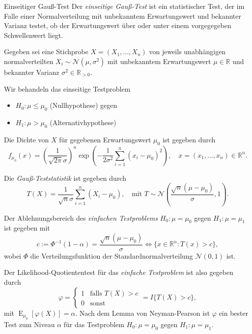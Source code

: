 \begin{defi}{Einseitiger Gauß-Test}
    Der \emph{einseitige Gauß-Test} ist ein statistischer Test, der im Falle einer Normalverteilung mit unbekanntem Erwartungswert und bekannter Varianz testet, ob der Erwartungswert über oder unter einem vorgegegeben Schwellenwert liegt.

    Gegeben sei eine Stichprobe $X = (X_1, \ldots, X_n)$ von jeweils unabhängigen normalverteilten $X_i \sim \mathcal{N}(\mu, \sigma^2)$ mit unbekanntem Erwartungswert $\mu \in \mathbb{R}$ und bekannter Varianz $\sigma^2 \in \mathbb{R}_{> 0}$.

    Wir behandeln das einseitige Testproblem
    \begin{itemize}
        \item $H_0: \mu \leq \mu_0$ (Nullhypothese) gegen
        \item $H_1: \mu > \mu_0$ (Alternativhypothese)
    \end{itemize}

    Die Dichte von $X$ für gegebenen Erwartungswert $\mu_0$ ist gegeben durch
    \[
        f_{\mu_0}(x) = \left( \frac{1}{\sqrt{2 \pi} \sigma} \right)^n \exp \left( -\frac{1}{2 \sigma^2} \sum_{i = 1}^{n} (x_i - \mu_0)^2 \right), \quad x = (x_1, \ldots, x_n) \in \mathbb{R}^n.
    \]

    Die \emph{Gauß-Teststatistik} ist gegeben durch
    \[
        T(X) = \frac{1}{\sqrt{n} \sigma} \sum_{i = 1}^{n} (X_i - \mu_0), \quad \text{mit } T \sim \mathcal{N} \left( \frac{\sqrt{n} (\mu - \mu_0)}{\sigma}, 1 \right).
    \]

    Der Ablehnungsbereich des \textit{einfachen Testproblems} $H_0: \mu = \mu_0$ gegen $H_1: \mu = \mu_1$ ist gegeben mit
    \[
        c := \Phi^{-1}(1 - \alpha) = \frac{\sqrt{n} (\mu - \mu_0)}{\sigma} \iff \{ x \in \mathbb{R}^n : T(x) > c \},
    \]
    wobei $\Phi$ die Verteilungsfunktion der Standardnormalverteilung $\mathcal{N}(0, 1)$ ist.

    Der Likelihood-Quotiententest für das \textit{einfache Testproblem} ist also gegeben durch
    \[
        \varphi = \begin{cases}
            1 & \text{falls } T(X) > c \\
            0 & \text{sonst}
        \end{cases}
        = I \{ T(X) > c \},
    \]
    mit $\operatorname{E}_{\mu_0}[\varphi(X)] = \alpha$.
    Nach dem Lemma von Neyman-Pearson ist $\varphi$ ein bester Test zum Niveau $\alpha$ für das Testproblem $H_0: \mu = \mu_0$ gegen $H_1: \mu = \mu_1$.


\end{defi}
